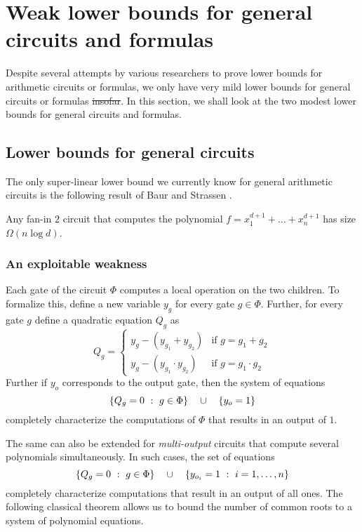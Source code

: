 \documentclass{birkjour}
\newcommand{\spaced}[1]{\quad#1\quad}
\providecommand{\DIFaddtex}[1]{{\protect\color{blue}\uwave{#1}}} %
\providecommand{\DIFdeltex}[1]{{\protect\color{red}\sout{#1}}}                      %
\providecommand{\DIFaddbegin}{} %
\providecommand{\DIFaddend}{} %
\providecommand{\DIFdelbegin}{} %
\providecommand{\DIFdelend}{} %
\providecommand{\DIFadd}[1]{\texorpdfstring{\DIFaddtex{#1}}{#1}} %
\providecommand{\DIFdel}[1]{\texorpdfstring{\DIFdeltex{#1}}{}} %
\begin{document}


\section{Weak lower bounds for general circuits and formulas}\label{sec:gen-ckt-formulas}

Despite several attempts by various researchers to prove lower bounds for arithmetic circuits or formulas, we only have very mild lower bounds for general circuits or formulas \DIFdelbegin \DIFdel{insofar}\DIFdelend \DIFaddbegin \DIFadd{thus far}\DIFaddend . In this section, we shall look at the two  modest lower bounds for general circuits and formulas. 

\subsection{Lower bounds for general circuits}\label{sec:baur-strassen}

The only super-linear lower bound we currently know for general arithmetic circuits is the following  result of Baur and Strassen \cite{BS83}.

\begin{theorem}[\cite{BS83}]\label{thm:baur-strassen}
  Any fan-in $2$ circuit that computes the polynomial $f = x_1^{d+1} + \dots + x_n^{d+1}$ has size $\Omega(n\log d)$. 
\end{theorem}

\subsubsection{An exploitable weakness}

Each gate of the circuit $\Phi$ computes a local operation on the two children. To formalize this, define a new variable $y_g$ for every gate $g \in \Phi$. Further, for every gate $g$ define a quadratic equation $Q_g$ as
$$
Q_g = \begin{cases} y_g - (y_{g_1} + y_{g_2}) & \text{if $g = g_1 + g_2$}\\
  y_g - (y_{g_1}\cdot y_{g_2}) & \text{if $g = g_1 \cdot g_2$}
\end{cases}
$$
Further if $y_o$  corresponds to the output gate, then the system of equations
$$\setdef{Q_g = 0}{g\in \Phi} \spaced{\union} \inbrace{y_{o} = 1}$$
completely characterize the computations of $\Phi$ that results in an output of $1$. 

The same can also be extended for \emph{multi-output} circuits that compute several polynomials simultaneously. In such cases, the set of equations
$$\setdef{Q_g = 0}{g\in \Phi} \spaced{\union} \setdef{y_{o_i} = 1}{i=1, \ldots, n}$$
completely characterize computations that result in an output of all ones. The following classical theorem allows us to bound the number of  common roots to a system of polynomial equations. 
\end{document}
